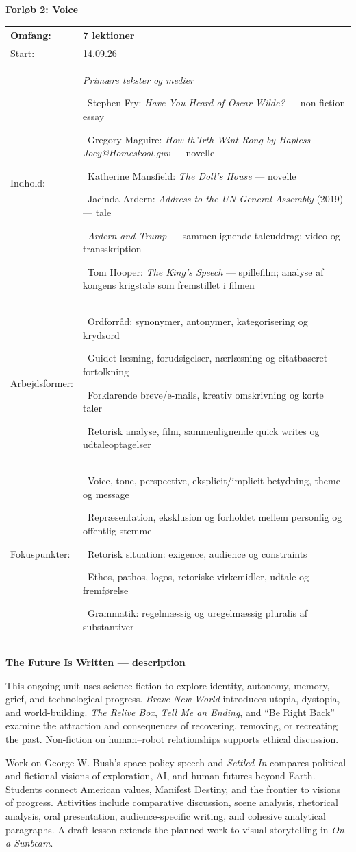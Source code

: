 \documentclass[10pt,a4paper]{article}
\newcommand{\ubheading}[1]{{\large\bfseries\overp\color{frbgreen}#1\par}}
\newcommand{\ubitem}[1]{\textbullet\ #1\par}
\newcommand{\ubgroup}[1]{\textit{#1}\par}
\newcommand{\unittable}[6]{%
  \vspace{1em}%
  \ubheading{#1}%
  \vspace{0.4em}%
  \begin{tabularx}{\linewidth}{|l|X|}
    \hline
    Omfang: & #3 \\\hline
    Start: & #2 \\\hline
    Indhold: & {\setlength{\parskip}{0pt}#4} \\\hline
    Arbejdsformer: & {\setlength{\parskip}{0pt}#5} \\\hline
    Fokuspunkter: & {\setlength{\parskip}{0pt}#6} \\\hline
  \end{tabularx}%
}
\begin{document}
\unittable{Forløb 2: Voice}{14.09.26}{7 lektioner}{%
  \ubgroup{Primære tekster og medier}
  \ubitem{Stephen Fry: \textit{Have You Heard of Oscar Wilde?} --- non-fiction essay}
  \ubitem{Gregory Maguire: \textit{How th'Irth Wint Rong by Hapless Joey@Homeskool.guv} --- novelle}
  \ubitem{Katherine Mansfield: \textit{The Doll's House} --- novelle}
  \ubitem{Jacinda Ardern: \textit{Address to the UN General Assembly} (2019) --- tale}
  \ubitem{\textit{Ardern and Trump} --- sammenlignende taleuddrag; video og transskription}
  \ubitem{Tom Hooper: \textit{The King's Speech} --- spillefilm; analyse af kongens krigstale som fremstillet i filmen}
}{%
  \ubitem{Ordforråd: synonymer, antonymer, kategorisering og krydsord}
  \ubitem{Guidet læsning, forudsigelser, nærlæsning og citatbaseret fortolkning}
  \ubitem{Forklarende breve/e-mails, kreativ omskrivning og korte taler}
  \ubitem{Retorisk analyse, film, sammenlignende quick writes og udtaleoptagelser}
}{%
  \ubitem{Voice, tone, perspective, eksplicit/implicit betydning, theme og message}
  \ubitem{Repræsentation, eksklusion og forholdet mellem personlig og offentlig stemme}
  \ubitem{Retorisk situation: exigence, audience og constraints}
  \ubitem{Ethos, pathos, logos, retoriske virkemidler, udtale og fremførelse}
  \ubitem{Grammatik: regelmæssig og uregelmæssig pluralis af substantiver}
}

\newpage
\ubheading{The Future Is Written --- description}
This ongoing unit uses science fiction to explore identity, autonomy, memory, grief, and technological progress. \textit{Brave New World} introduces utopia, dystopia, and world-building. \textit{The Relive Box}, \textit{Tell Me an Ending}, and ``Be Right Back'' examine the attraction and consequences of recovering, removing, or recreating the past. Non-fiction on human--robot relationships supports ethical discussion.

Work on George W. Bush's space-policy speech and \textit{Settled In} compares political and fictional visions of exploration, AI, and human futures beyond Earth. Students connect American values, Manifest Destiny, and the frontier to visions of progress. Activities include comparative discussion, scene analysis, rhetorical analysis, oral presentation, audience-specific writing, and cohesive analytical paragraphs. A draft lesson extends the planned work to visual storytelling in \textit{On a Sunbeam}.
\end{document}
